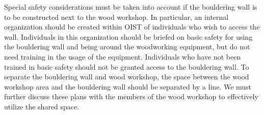 Special safety considerations must be taken into account if the bouldering wall is to be constructed next to the wood workshop. In particular, an internal organization should be created within OIST of individuals who wish to access the wall. Individuals in this organization should be briefed on basic safety for using the bouldering wall and being around the woodworking equipment, but do not need training in the usage of the equipment. Individuals who have not been trained in basic safety should not be granted access to the bouldering wall. To separate the bouldering wall and wood workshop, the space  between the wood workshop area and the bouldering wall should be separated by a line. We must further discuss these plans with the members of the wood workshop to effectively utilize the shared space.

